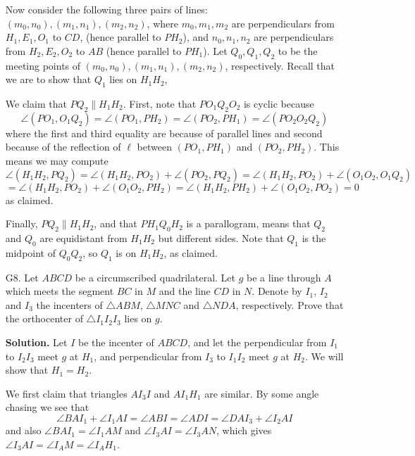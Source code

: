\documentclass[11pt,a4paper]{article}
\begin{document}
\begin{enumerate}
    	Now consider the following three pairs of lines: $(m_0, n_0), (m_1, n_1), (m_2, n_2)$, 
    	where $m_0, m_1, m_2$ are perpendiculars from $H_1, E_1, O_1$ to $CD$, 
    	(hence parallel to $PH_2$), 
    	and $n_0, n_1, n_2$ are perpendiculars from $H_2, E_2, O_2$ to $AB$ (hence parallel to $PH_1$). 
    	Let $Q_0, Q_1, Q_2$ to be the meeting points of $(m_0, n_0), (m_1, n_1), (m_2, n_2)$, respectively. 
    	Recall that we are to show that $Q_1$ lies on $H_1H_2$, 
    	
    	We claim that $PQ_2\parallel H_1H_2$. First, note that $PO_1Q_2O_2$ is cyclic because 
    	\[
    	\angle (PO_1, O_1Q_2) = \angle (PO_1, PH_2)
    	=\angle (PO_2, PH_1) = \angle(PO_2 O_2Q_2)
    	\]
    	where the first and third equality are because of parallel lines and second because of the reflection of $\ell$ between $(PO_1, PH_1)$ and $(PO_2, PH_2)$. 
    	This means we may compute 
    	\[
    	\angle (H_1H_2, PQ_2)
    	=\angle (H_1H_2, PO_2) + \angle (PO_2, PQ_2)
    	=\angle (H_1H_2, PO_2) + \angle (O_1O_2, O_1Q_2)
    	\]\[
    	=\angle (H_1H_2, PO_2) + \angle (O_1O_2, PH_2)
    	=\angle (H_1H_2, PH_2) + \angle (O_1O_2, PO_2)
    	=0
    	\]
    	as claimed. 
    	
    	Finally, $PQ_2\parallel H_1H_2$, 
    	and that $PH_1Q_0H_2$ is a parallogram,
    	means that $Q_2$ and $Q_0$ are equidistant from $H_1H_2$ but different sides. 
    	Note that $Q_1$ is the midpoint of $Q_0Q_2$, 
    	so $Q_1$ is on $H_1H_2$, as claimed. 
    	
    	\item [G8.]
    	Let $ABCD$ be a circumscribed quadrilateral. Let $g$ be a line through $A$ which meets the segment $BC$ in $M$ and the line $CD$ in $N$. Denote by $I_1$, $I_2$ and $I_3$ the incenters of $\triangle ABM$, $\triangle MNC$ and $\triangle NDA$, respectively. Prove that the orthocenter of $\triangle I_1I_2I_3$ lies on $g$.
    	
    	\textbf{Solution.} 
    	Let $I$ be the incenter of $ABCD$, and let the perpendicular from $I_1$ to $I_2I_3$ meet $g$ at $H_1$, 
    	and perpendicular from $I_3$ to $I_1I_2$ meet $g$ at $H_2$. 
    	We will show that $H_1=H_2$. 
    	
    	We first claim that triangles $AI_3I $ and $AI_1H_1$ are similar. 
    	By some angle chasing we see that 
    	\[
    	\angle BAI_1 + \angle I_1AI = \angle ABI = \angle ADI = \angle DAI_3 + \angle I_2AI
    	\]
    	and also $\angle BAI_1 = \angle I_1AM$ and $\angle I_3AI = \angle I_3AN$, 
    	which gives $\angle I_3AI =\angle I_AM = \angle I_AH_1$. 
    	

\end{enumerate}
\end{document}
